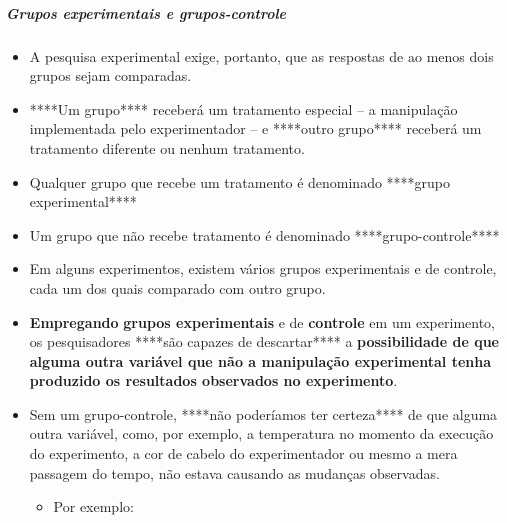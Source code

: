 \documentclass[
]{book}
\providecommand{\tightlist}{%
  \setlength{\itemsep}{0pt}\setlength{\parskip}{0pt}}
\begin{document}
\hypertarget{grupos-experimentais-e-grupos-controle}{%
\subparagraph{Grupos experimentais e
grupos-controle}\label{grupos-experimentais-e-grupos-controle}}

\begin{itemize}
\tightlist
\item
  A pesquisa experimental exige, portanto, que as respostas de ao menos
  dois grupos sejam comparadas.
\item
  ****Um grupo**** receberá um tratamento especial -- a manipulação
  implementada pelo experimentador -- e ****outro grupo**** receberá um
  tratamento diferente ou nenhum tratamento.
\item
  Qualquer grupo que recebe um tratamento é denominado ****grupo
  experimental****
\item
  Um grupo que não recebe tratamento é denominado ****grupo-controle****
\item
  Em alguns experimentos, existem vários grupos experimentais e de
  controle, cada um dos quais comparado com outro grupo.
\item
  \textbf{Empregando} \textbf{grupos experimentais} e de
  \textbf{controle} em um experimento, os pesquisadores ****são capazes
  de descartar**** a \textbf{possibilidade de que alguma outra variável
  que não a manipulação experimental tenha produzido os resultados
  observados no experimento}.
\item
  Sem um grupo-controle, ****não poderíamos ter certeza**** de que
  alguma outra variável, como, por exemplo, a temperatura no momento da
  execução do experimento, a cor de cabelo do experimentador ou mesmo a
  mera passagem do tempo, não estava causando as mudanças observadas.

  \begin{itemize}
  \tightlist
  \item
    Por exemplo:


\end{itemize}
\end{itemize}
\end{document}
